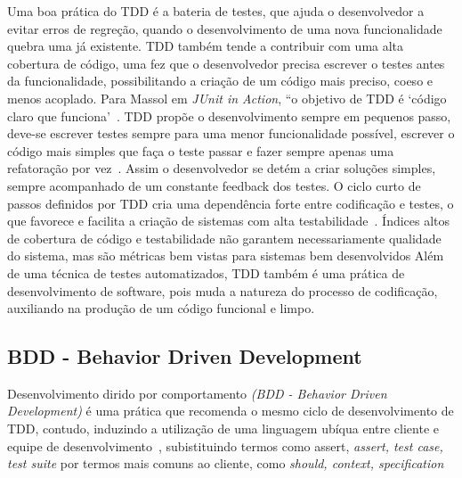 Uma boa prática do TDD é a bateria de testes, que ajuda o desenvolvedor a evitar erros de regreção, quando o desenvolvimento de uma nova funcionalidade quebra uma já existente. TDD também tende a contribuir com uma alta cobertura de código, uma fez que o desenvolvedor precisa escrever o testes antes da funcionalidade, possibilitando a criação de um código mais preciso, coeso e menos acoplado. 
%
Para Massol em \textit{JUnit in Action}, “o objetivo de TDD é ‘código claro que funciona’~\cite{massol2003}.
%
TDD propõe o desenvolvimento sempre em pequenos passo, deve-se escrever testes sempre para uma menor funcionalidade possível, escrever o código mais simples que faça o teste passar e fazer sempre apenas uma refatoração por vez~\cite{beck2002}. Assim o desenvolvedor se detém a criar soluções simples, sempre acompanhado de um constante feedback dos testes.
%
O ciclo curto de passos definidos por TDD cria uma dependência forte entre codificação e testes, o que favorece e facilita a criação de sistemas com alta testabilidade~\cite{bernardo2011}. Índices altos de cobertura de código e testabilidade não garantem necessariamente qualidade do sistema, mas são métricas bem vistas para sistemas bem desenvolvidos
%
Além de uma técnica de testes automatizados, TDD também é uma prática de desenvolvimento de software, pois muda a natureza do processo de codificação, auxiliando na produção de um código funcional e limpo.
%
\subsection{BDD - Behavior Driven Development}
Desenvolvimento dirido por comportamento \textit{(BDD - Behavior Driven Development)} é uma prática que recomenda o mesmo ciclo de desenvolvimento de TDD, contudo, induzindo a utilização de uma linguagem ubíqua entre cliente e equipe de desenvolvimento~\cite{bernardo2011}, subistituindo termos como assert, \textit{assert, test case, test suite} por termos mais comuns ao cliente, como \textit{should, context, specification}

